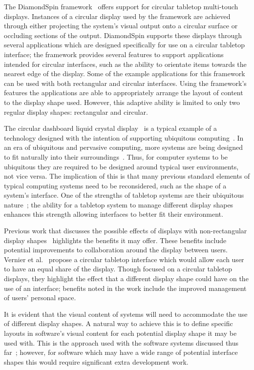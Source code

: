 \documentclass{bmcart}
\begin{document}
The DiamondSpin framework~\cite{Shen2004} offers support for circular tabletop multi-touch displays.
Instances of a circular display used by the framework are achieved through either projecting the system's visual output onto a circular surface or occluding sections of the output.
DiamondSpin supports these displays through several applications which are designed specifically for use on a circular tabletop interface; the framework provides several features to support applications intended for circular interfaces, such as the ability to orientate items towards the nearest edge of the display.
Some of the example applications for this framework can be used with both rectangular and circular interfaces.
Using the framework's features the applications are able to appropriately arrange the layout of content to the display shape used.
However, this adaptive ability is limited to only two regular display shapes: rectangular and circular.

The circular dashboard liquid crystal display~\cite{Boyd2007} is a typical example of a technology designed with the intention of supporting ubiquitous computing~\cite{Weiser1999}.
In an era of ubiquitous and pervasive computing, more systems are being designed to fit naturally into their surroundings~\cite{Greenfield2006}.
Thus, for computer systems to be ubiquitous they are required to be designed around typical user environments, not vice versa.
The implication of this is that many previous standard elements of typical computing systems need to be reconsidered, such as the shape of a system's interface.
One of the strengths of tabletop systems are their ubiquitous nature~\cite{Smith2012}; the ability for a tabletop system to manage different display shapes enhances this strength allowing interfaces to better fit their environment.

Previous work that discusses the possible effects of displays with non-rectangular display shapes~\cite{Vernier2002} highlights the benefits it may offer.
These benefits include potential improvements to collaboration around the display between users.
Vernier et al.~\cite{Vernier2002} propose a circular tabletop interface which would allow each user to have an equal share of the display.
Though focused on a circular tabletop displays, they highlight the effect that a different display shape could have on the use of an interface; benefits noted in the work include the improved management of users' personal space.

It is evident that the visual content of systems will need to accommodate the use of different display shapes.
A natural way to achieve this is to define specific layouts in software's visual content for each potential display shape it may be used with.
This is the approach used with the software systems discussed thus far~\cite{Hansen2009,Shen2004}; however, for software which may have a wide range of potential interface shapes this would require significant extra development work.
\end{document}
